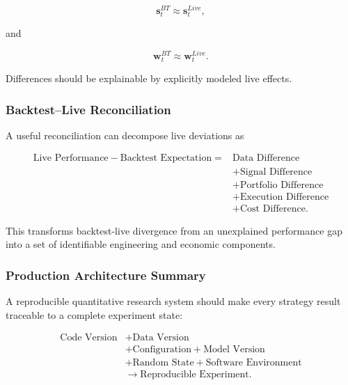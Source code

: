 \documentclass[11pt,a4paper]{article}
\begin{document}
\begin{equation}
\boxed{
\mathbf{s}_t^{BT}
\approx
\mathbf{s}_t^{Live},
}
\end{equation}

and

\begin{equation}
\boxed{
\mathbf{w}_t^{BT}
\approx
\mathbf{w}_t^{Live}.
}
\end{equation}

Differences should be explainable by explicitly modeled live effects.


\subsubsection{Backtest--Live Reconciliation}

A useful reconciliation can decompose live deviations as

\begin{equation}
\boxed{
\begin{aligned}
\text{Live Performance}
-
\text{Backtest Expectation}
=
&
\text{Data Difference}
\\
&+
\text{Signal Difference}
\\
&+
\text{Portfolio Difference}
\\
&+
\text{Execution Difference}
\\
&+
\text{Cost Difference}.
\end{aligned}
}
\end{equation}

This transforms backtest-live divergence from an unexplained performance gap
into a set of identifiable engineering and economic components.


\subsubsection{Production Architecture Summary}

A reproducible quantitative research system should make every strategy result
traceable to a complete experiment state:

\begin{equation}
\boxed{
\begin{aligned}
\text{Code Version}
&+
\text{Data Version}
\\
&+
\text{Configuration}
+
\text{Model Version}
\\
&+
\text{Random State}
+
\text{Software Environment}
\\
&\rightarrow
\text{Reproducible Experiment}.
\end{aligned}
}
\end{equation}
\end{document}
